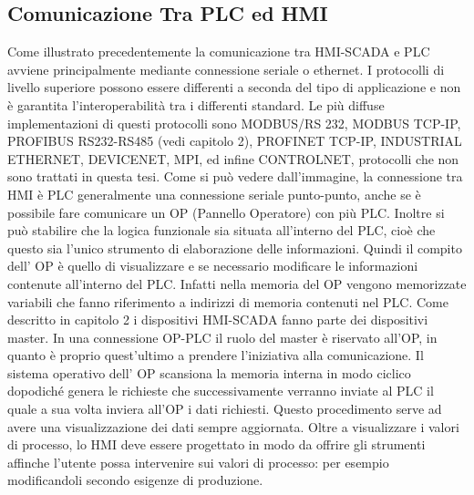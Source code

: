\documentclass[12pt, a4paper, oneside]{book}
\begin{document}
\subsection{Comunicazione Tra PLC ed HMI} 
Come illustrato precedentemente la comunicazione tra HMI-SCADA e PLC avviene principalmente mediante connessione seriale o ethernet. I protocolli di livello superiore possono essere differenti a seconda del tipo di applicazione e non è garantita l'interoperabilità tra i differenti standard. Le più diffuse implementazioni di questi protocolli sono MODBUS/RS 232, MODBUS TCP-IP, PROFIBUS RS232-RS485 (vedi capitolo 2), PROFINET TCP-IP, INDUSTRIAL ETHERNET, DEVICENET, MPI, ed infine CONTROLNET, protocolli che non sono trattati in questa tesi.
Come si può vedere dall'immagine, la connessione tra HMI è PLC generalmente una connessione seriale punto-punto, anche se è possibile fare comunicare un OP (Pannello Operatore) con più PLC. Inoltre si può stabilire che la logica funzionale sia situata all'interno del PLC, cioè che questo sia l'unico strumento di elaborazione delle informazioni. Quindi il compito dell' OP è quello di visualizzare e se necessario modificare le informazioni contenute all'interno del PLC. Infatti nella memoria del OP vengono memorizzate variabili che fanno riferimento a indirizzi di memoria contenuti nel PLC. Come descritto in capitolo 2 i dispositivi HMI-SCADA fanno parte dei dispositivi master. In una connessione OP-PLC il ruolo del master è riservato all'OP, in quanto è proprio quest'ultimo a prendere l'iniziativa alla comunicazione. Il sistema operativo dell' OP scansiona la memoria interna in modo ciclico dopodiché genera le richieste che successivamente verranno inviate al PLC il quale a sua volta inviera all'OP i dati richiesti. Questo procedimento serve ad avere una visualizzazione dei dati sempre aggiornata. Oltre a visualizzare i valori di processo, lo HMI deve essere progettato in modo da offrire gli strumenti affinche l'utente possa intervenire sui valori di processo: per esempio modificandoli secondo esigenze di produzione.
\end{document}
